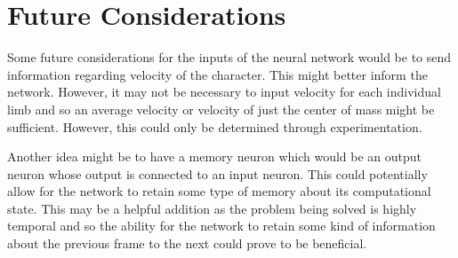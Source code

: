 \documentclass[letterpaper]{article} %
\begin{document}
\section{Future Considerations}
Some future considerations for the inputs of the neural network would be to send information regarding velocity of the character. This might better inform the network. However, it may not be necessary to input velocity for each individual limb and so an average velocity or velocity of just the center of mass might be sufficient. However, this could only be determined through experimentation.

\par Another idea might be to have a memory neuron which would be an output neuron whose output is connected to an input neuron. This could potentially allow for the network to retain some type of memory about its computational state. This may be a helpful addition as the problem being solved is highly temporal and so the ability for the network to retain some kind of information about the previous frame to the next could prove to be beneficial.
\end{document}

